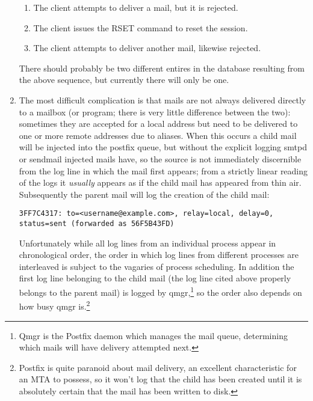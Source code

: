 \documentclass[a4paper,12pt,draft]{article}
\begin{document}
\begin{enumerate}
        \begin{enumerate}

            \item The client attempts to deliver a mail, but it is
                rejected.

            \item The client issues the RSET command to reset the session.

            \item The client attempts to deliver another mail, likewise
                rejected.

        \end{enumerate}

        There should probably be two different entires in the database
        resulting from the above sequence, but currently there will only be
        one.

    \item The most difficult complication is that mails are not always
        delivered directly to a mailbox (or program; there is very little
        difference between the two): sometimes they are accepted for a
        local address but need to be delivered to one or more remote
        addresses due to aliases.  When this occurs a child mail will be
        injected into the postfix queue, but without the explicit logging
        smtpd or sendmail injected mails have, so the source is not
        immediately discernible from the log line in which the mail first
        appears; from a strictly linear reading of the logs it
        \textit{usually\/} appears as if the child mail has appeared from
        thin air.  Subsequently the parent mail will log the creation of
        the child mail:

        \texttt{3FF7C4317: to=<username@example.com>, relay=local, \newline 
        delay=0, status=sent (forwarded as 56F5B43FD)}

        Unfortunately while all log lines from an individual process appear
        in chronological order, the order in which log lines from different
        processes are interleaved is subject to the vagaries of process
        scheduling.  In addition the first log line belonging to the child
        mail (the log line cited above properly belongs to the parent mail)
        is logged by qmgr,\footnote{Qmgr is the Postfix daemon which
        manages the mail queue, determining which mails will have delivery
        attempted next.} so the order also depends on how busy qmgr
        is.\footnote{Postfix is quite paranoid about mail delivery, an
        excellent characteristic for an MTA to possess, so it won't log
        that the child has been created until it is absolutely certain that
        the mail has been written to disk.}


\end{enumerate}
\end{document}
